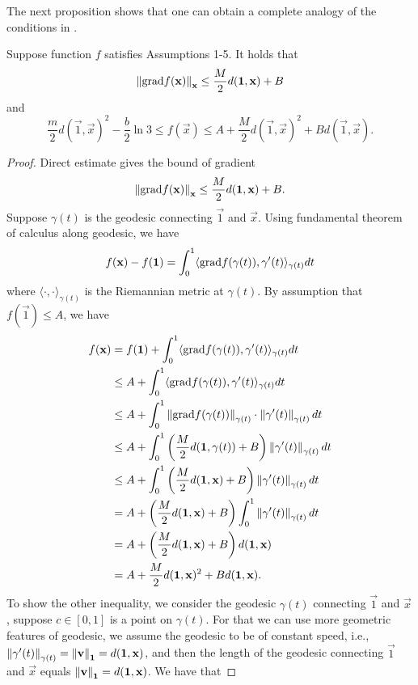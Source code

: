 The next proposition shows that one can obtain a complete analogy of the conditions in \cite{RRT17}. 

\begin{proposition}\label{lemma:bound of f}
Suppose function $f$ satisfies Assumptions 1-5. It holds that
\[
\left\Vert \mathrm{grad} f(\mathbf{x}) \right\Vert_{\mathbf{x}}\le \frac{M}{2}d(\mathbf{1},\mathbf{x})+B
\]
and 
\[
\frac{m}{2}d(\vec{1},\vec{x})^2-\frac{b}{2}\ln 3\le f(\vec{x})\le A+\frac{M}{2}d(\vec{1},\vec{x})^2+Bd(\vec{1},\vec{x}).
\]
\end{proposition}

\begin{proof}
Direct estimate gives the bound of gradient 
\[
\left\Vert \mathrm{grad} f(\mathbf{x}) \right\Vert_{\mathbf{x}}\le\frac{M}{2}d(\mathbf{1},\mathbf{x})+B.
\]
Suppose $\gamma(t)$ is the geodesic connecting $\vec{1}$ and $\vec{x}$. Using fundamental theorem of calculus along geodesic, we have
\[
f(\mathbf{x})-f(\mathbf{1})=\int_0^1\langle\mathrm{grad} f(\gamma(t)),\gamma'(t)\rangle_{\gamma(t)}dt
\]
where $\langle\cdot,\cdot\rangle_{\gamma(t)}$ is the Riemannian metric at $\gamma(t)$. By assumption that $f(\vec{1})\le A$, we have
\begin{equation}
\begin{split}
f(\mathbf{x})&=f(\mathbf{1})+\int_0^1\langle\mathrm{grad} f(\gamma(t)),\gamma'(t)\rangle_{\gamma(t)}dt
\\
&\le A+\int_0^1\langle\mathrm{grad} f(\gamma(t)),\gamma'(t)\rangle_{\gamma(t)}dt
\\
&\le A+\int_0^1\left\Vert \mathrm{grad} f(\gamma(t)) \right\Vert_{\gamma(t)}\cdot\left\Vert \gamma'(t) \right\Vert_{\gamma(t)}dt
\\
&\le A+\int_0^1\left(\frac{M}{2}d(\mathbf{1},\gamma(t))+B\right)\left\Vert \gamma'(t) \right\Vert_{\gamma(t)}dt
\\
&\le A+\int_0^1\left(\frac{M}{2}d(\mathbf{1},\mathbf{x})+B\right)\left\Vert \gamma'(t) \right\Vert_{\gamma(t)}dt
\\
&=A+\left(\frac{M}{2}d(\mathbf{1},\mathbf{x})+B\right)\int_0^1\left\Vert \gamma'(t) \right\Vert_{\gamma(t)}dt
\\
&=A+\left(\frac{M}{2}d(\mathbf{1},\mathbf{x})+B\right)d(\mathbf{1},\mathbf{x})
\\
&=A+\frac{M}{2}d(\mathbf{1},\mathbf{x})^2+Bd(\mathbf{1},\mathbf{x}).
\end{split}
\end{equation}
To show the other inequality, we consider the geodesic $\gamma(t)$ connecting $\vec{1}$ and $\vec{x}$, suppose $c\in[0,1]$ is a point on $\gamma(t)$. For that we can use more geometric features of geodesic, we assume the geodesic to be of constant speed, i.e., $\left\Vert \gamma'(t) \right\Vert_{\gamma(t)}=\left\Vert \mathbf{v} \right\Vert_{\mathbf{1}}=d(\mathbf{1},\mathbf{x})$, and then the length of the geodesic connecting $\vec{1}$ and $\vec{x}$ equals $\left\Vert \mathbf{v} \right\Vert_{\mathbf{1}}=d(\mathbf{1},\mathbf{x})$. We have that

\end{proof}
